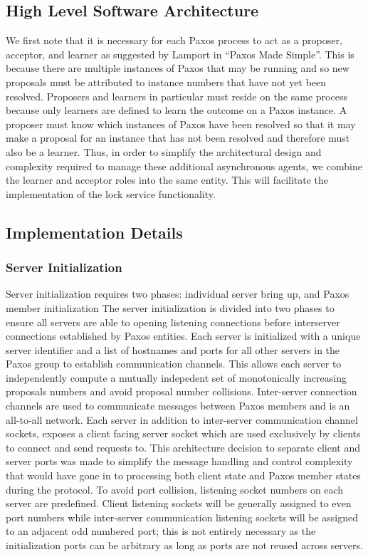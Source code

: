 \documentclass{article}
\begin{document}
\subsection{High Level Software Architecture}

We first note that it is necessary for each Paxos process to act as a proposer, acceptor, and learner as suggested by Lamport in ``Paxos Made Simple''.
This is because there are multiple instances of Paxos that may be running and so new proposals must be attributed to instance numbers that have not yet been resolved.
Proposers and learners in particular must reside on the same process because only learners are defined to learn the outcome on a Paxos instance.
A proposer must know which instances of Paxos have been resolved so that it may make a proposal for an instance that has not been resolved and therefore must also be a learner.
Thus, in order to simplify the architectural design and complexity required to manage these additional asynchronous agents, we combine the learner and acceptor roles into the same entity.
This will facilitate the implementation of the lock service functionality.

\subsection{Implementation Details}

\subsubsection{Server Initialization}

Server initialization requires two phases: individual server bring up, and Paxos member initialization
The server initialization is divided into two phases to ensure all servers are able to opening listening connections before interserver connections established by Paxos entities.
Each server is initialized with a unique server identifier and a list of hostnames and ports for all other servers in the Paxos group to establish communication channels.
This allows each server to independently compute a mutually indepedent set of monotonically increasing proposals numbers and avoid proposal number collisions.
Inter-server connection channels are used to communicate messages between Paxos members and is an all-to-all network.
Each server in addition to inter-server communication channel sockets, exposes a client facing server socket which are used exclusively by clients to connect and send requests to.
This architecture decision to separate client and server ports was made to simplify the message handling and control complexity that would have gone in to processing both client state and Paxos member states during the protocol.
To avoid port collision, listening socket numbers on each server are predefined.
Client listening sockets will be generally assigned to even port numbers while inter-server communication listening sockets will be assigned to an adjacent odd numbered port; this is not entirely necessary as the initialization ports can be arbitrary as long as ports are not reused across servers.
\end{document}
